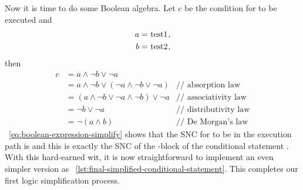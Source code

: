 Now it is time to do some Boolean algebra.
Let $c$ be the condition for  to be executed and
\begin{align*}
    a &= \text{\code{test1}}, \\
    b &= \text{\code{test2}},
\end{align*}
then
\begin{align}
    c &= a \land \lnot b \lor \lnot a  \nonumber \\
    &= a \land \lnot b \lor (\lnot a \land \lnot b \lor \lnot a \nonumber) & \text{// absorption law
    }\\
    &= (a \land \lnot b \lor \lnot a \land \lnot b) \lor \lnot a \nonumber & \text{// associativity
    law}\\
    &= \lnot b \lor \lnot a & \text{// distributivity law} \nonumber \\
    &=\lnot (a \land b) & \text{// De Morgan's law} \label{eq:boolean-expression-simplify}
\end{align}
~\autoref{eq:boolean-expression-simplify} shows that the SNC for
 to be in the execution path
is  and this is exactly the SNC of the
-block of the conditional statement .
With this hard-earned wit, it is now straightforward to implement an even simpler version as
~\autoref{lst:final-simplified-conditional-statement}.
This completes our first logic simplification process.


